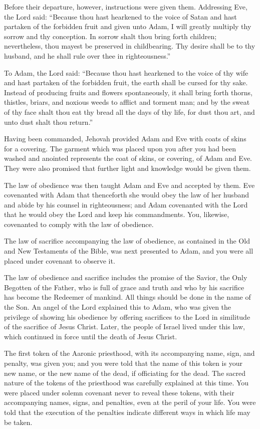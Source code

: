 				Before their departure, however, instructions were given them. Addressing Eve, the Lord said: ``Because thou hast hearkened to the voice of Satan and hast partaken of the forbidden fruit and given unto Adam, I will greatly multiply thy sorrow and thy conception. In sorrow shalt thou bring forth children; nevertheless, thou mayest be preserved in childbearing. Thy desire shall be to thy husband, and he shall rule over thee in righteousness.''

				To Adam, the Lord said: ``Because thou hast hearkened to the voice of thy wife and hast partaken of the forbidden fruit, the earth shall be cursed for thy sake. Instead of producing fruits and flowers spontaneously, it shall bring forth thorns, thistles, briars, and noxious weeds to afflict and torment man; and by the sweat of thy face shalt thou eat thy bread all the days of thy life, for dust thou art, and unto dust shalt thou return.''

				Having been commanded, Jehovah provided Adam and Eve with coats of skins for a covering. The garment which was placed upon you after you had been washed and anointed represents the coat of skins, or covering, of Adam and Eve. They were also promised that further light and knowledge would be given them.

				The law of obedience was then taught Adam and Eve and accepted by them. Eve covenanted with Adam that thenceforth she would obey the law of her husband and abide by his counsel in righteousness; and Adam covenanted with the Lord that he would obey the Lord and keep his commandments. You, likewise, covenanted to comply with the law of obedience.

				The law of sacrifice accompanying the law of obedience, as contained in the Old and New Testaments of the Bible, was next presented to Adam, and you were all placed under covenant to observe it.

				The law of obedience and sacrifice includes the promise of the Savior, the Only Begotten of the Father, who is full of grace and truth and who by his sacrifice has become the Redeemer of mankind. All things should be done in the name of the Son. An angel of the Lord explained this to Adam, who was given the privilege of showing his obedience by offering sacrifices to the Lord in similitude of the sacrifice of Jesus Christ. Later, the people of Israel lived under this law, which continued in force until the death of Jesus Christ.

				The first token of the Aaronic priesthood, with its accompanying name, sign, and penalty, was given you; and you were told that the name of this token is your new name, or the new name of the dead, if officiating for the dead. The sacred nature of the tokens of the priesthood was carefully explained at this time. You were placed under solemn covenant never to reveal these tokens, with their accompanying names, signs, and penalties, even at the peril of your life. You were told that the execution of the penalties indicate different ways in which life may be taken.


